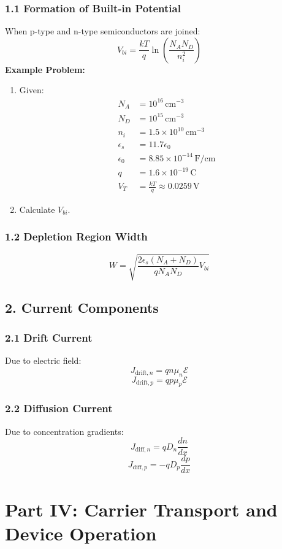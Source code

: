 \documentclass[12pt]{article}
\begin{document}
\subsubsection{1.1 Formation of Built-in Potential}
When p-type and n-type semiconductors are joined:
\[
V_{bi} = \frac{kT}{q}\ln\left(\frac{N_A N_D}{n_i^2}\right)
\]
\textbf{Example Problem:}
\begin{enumerate}
    \item Given:
    \begin{align*}
    N_A &= 10^{16}\, \text{cm}^{-3} \\
    N_D &= 10^{15}\, \text{cm}^{-3} \\
    n_i &= 1.5 \times 10^{10}\, \text{cm}^{-3} \\
    \epsilon_s &= 11.7 \epsilon_0 \\
    \epsilon_0 &= 8.85 \times 10^{-14}\, \text{F/cm} \\
    q &= 1.6 \times 10^{-19}\, \text{C} \\
    V_T &= \frac{kT}{q} \approx 0.0259\, \text{V}
    \end{align*}
    \item Calculate \( V_{bi} \).
\end{enumerate}

\subsubsection{1.2 Depletion Region Width}
\[
W = \sqrt{\frac{2\epsilon_s (N_A + N_D)}{q N_A N_D} V_{bi}}
\]

\subsection{2. Current Components}

\subsubsection{2.1 Drift Current}
Due to electric field:
\[
J_{\text{drift},n} = qn\mu_n \mathcal{E}
\]
\[
J_{\text{drift},p} = qp\mu_p \mathcal{E}
\]

\subsubsection{2.2 Diffusion Current}
Due to concentration gradients:
\[
J_{\text{diff},n} = qD_n \frac{dn}{dx}
\]
\[
J_{\text{diff},p} = -qD_p \frac{dp}{dx}
\]

\section{Part IV: Carrier Transport and Device Operation}
\end{document}
